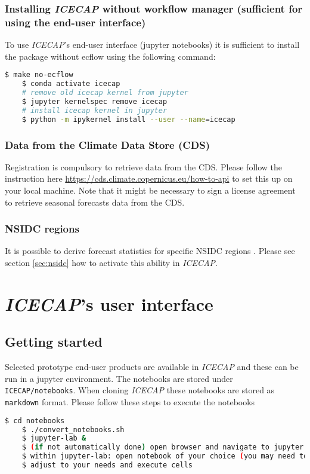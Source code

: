 \documentclass[DIV=10, parskip=full]{scrreprt}
\newcommand{\ice}{\textit{ICECAP}\xspace}
\begin{document}
\subsection{Installing \ice without workflow manager (sufficient for using the end-user interface)}
To use  \ice's end-user interface (jupyter notebooks) it is sufficient to install the package without ecflow using the following command:
\begin{lstlisting}[language=bash]
	$ make no-ecflow
	$ conda activate icecap
	# remove old icecap kernel from jupyter
	$ jupyter kernelspec remove icecap
	# install icecap kernel in jupyter
	$ python -m ipykernel install --user --name=icecap
\end{lstlisting}



	
\subsection{Data from the Climate Data Store (CDS)}
\label{subsec:cds}
Registration is compulsory to retrieve data from the CDS. Please follow the instruction here \url{https://cds.climate.copernicus.eu/how-to-api} to set this up on your local machine. Note that it might be necessary to sign a license agreement to retrieve seasonal forecasts data from the CDS.


	
\subsection{NSIDC regions}
\label{subsec:nsidc}
It is possible to derive forecast statistics for specific NSIDC regions \citep{Meier2023}. Please see section \ref{sec:nsidc} how to activate this ability in \ice.

\chapter{\ice's user interface}

\section{Getting started}
Selected prototype end-user products are available in \ice and these can be run in a jupyter environment.  The notebooks are stored under \texttt{ICECAP/notebooks}. When cloning \ice these notebooks are stored as \texttt{markdown} format. Please follow these steps to execute the notebooks
\begin{lstlisting}[language=bash]
	$ cd notebooks
	$ ./convert_notebooks.sh
	$ jupyter-lab & 
	$ (if not automatically done) open browser and navigate to jupyter lab
	$ within jupyter-lab: open notebook of your choice (you may need to set kernel to icecap)
	$ adjust to your needs and execute cells
\end{lstlisting}
\end{document}
